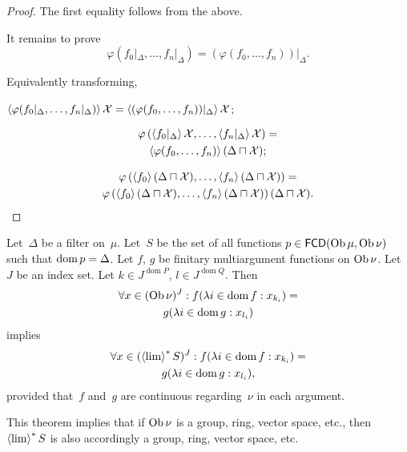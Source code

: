 \begin{proof}
  The first equality follows from the above.
  
  It remains to prove \[ \varphi (f_0 |_{\Delta}, \ldots, f_n |_{\Delta}) =
  (\varphi (f_0, \ldots, f_n)) |_{\Delta}. \]
  
  Equivalently transforming,
  
  $\left\langle \varphi (f_0 |_{\Delta}, \ldots, f_n |_{\Delta})\right\rangle \mathcal{X} =
  \left\langle (\varphi (f_0, \ldots, f_n)) |_{\Delta}\right\rangle \mathcal{X}$;
  
\begin{multline*}
  \varphi \left( \left\langle f_0 |_{\Delta}\right\rangle \mathcal{X}, \ldots, \left\langle f_n
  |_{\Delta}\right\rangle \mathcal{X} \right) =\\ \left\langle \varphi (f_0, \ldots, f_n)\right\rangle
  (\Delta \sqcap \mathcal{X});
\end{multline*}
  
\begin{multline*}
  \varphi \left( \left\langle f_0\right\rangle (\Delta \sqcap \mathcal{X}), \ldots,
  \left\langle f_n\right\rangle (\Delta \sqcap \mathcal{X}) \right) =\\ \varphi \left(
  \left\langle f_0\right\rangle (\Delta \sqcap \mathcal{X}), \ldots, \left\langle f_n\right\rangle (\Delta
  \sqcap \mathcal{X}) \right) (\Delta \sqcap \mathcal{X}).
\end{multline*}
\end{proof}

\begin{thm}
Let~$\Delta$ be a filter on~$\mu$.
Let~$S$ be the set of all functions $p\in\mathsf{FCD}(\operatorname{Ob}\mu,\operatorname{Ob}\nu)$
such that $\operatorname{dom} p=\Delta$.
Let $f$, $g$ be
finitary multiargument functions on $\operatorname{Ob}\nu$.
Let $J$ be an index
set. Let $k \in J^{\operatorname{dom} P}$, $l \in J^{\operatorname{dom} Q}$. Then
\begin{multline*}
\forall x \in (\operatorname{Ob}\nu)^J : f (\lambda i \in \operatorname{dom} f : x_{k_i}) =\\ g (\lambda
   i \in \operatorname{dom} g : x_{l_i})
\end{multline*}
implies
\begin{multline*}
   \forall x \in (\left\langle \lim\right\rangle ^{\ast}S)^J : f (\lambda i \in
   \operatorname{dom} f : x_{k_i}) =\\ g (\lambda i \in \operatorname{dom} g : x_{l_i}) ,
\end{multline*}
provided that~$f$ and~$g$ are continuous regarding~$\nu$ in each argument.
\end{thm}

\begin{rem}
This theorem implies that if $\operatorname{Ob}\nu$ is a group, ring, vector space, etc., then $\left\langle \lim\right\rangle ^{\ast}S$ is also accordingly a group, ring, vector space, etc.
\end{rem}

